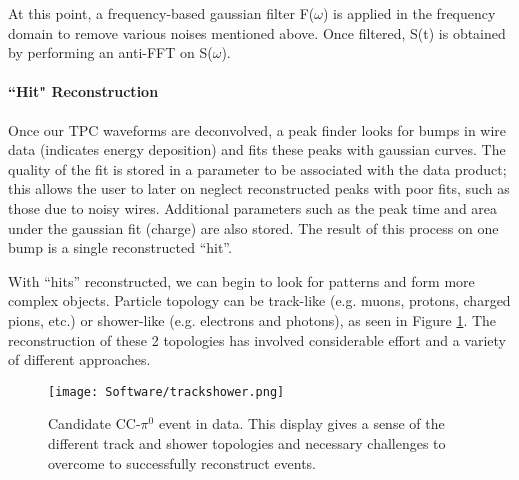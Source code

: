 \noindent At this point, a frequency-based gaussian filter F($\omega$) is applied in the frequency domain to remove various noises mentioned above. Once filtered, S(t) is obtained by performing an anti-FFT on S($\omega$). 

\paragraph{``Hit" Reconstruction}
 Once our TPC waveforms are deconvolved, a peak finder looks for bumps in wire data (indicates energy deposition) and fits these peaks with gaussian curves. The quality of the fit is stored in a parameter to be associated with the data product; this allows the user to later on neglect reconstructed peaks with poor fits, such as those due to noisy wires.  Additional parameters such as the peak time and area under the gaussian fit (charge) are also stored. The result of this process on one bump is a single reconstructed ``hit''. 

\par With ``hits'' reconstructed, we can begin to look for patterns and form more complex objects. Particle topology can be track-like (e.g. muons, protons, charged pions, etc.) or shower-like (e.g. electrons and photons), as seen in Figure \ref{fig:trackshower}. The reconstruction of these 2 topologies has involved considerable effort and a variety of different approaches.  

\begin{figure}[h!]
\centering
\texttt{[image: Software/trackshower.png]}
\caption{Candidate CC-$\pi^0$ event in data. This display gives a sense of the different track and shower topologies and necessary challenges to overcome to successfully reconstruct events.} 
\label{fig:trackshower}
\end{figure}

